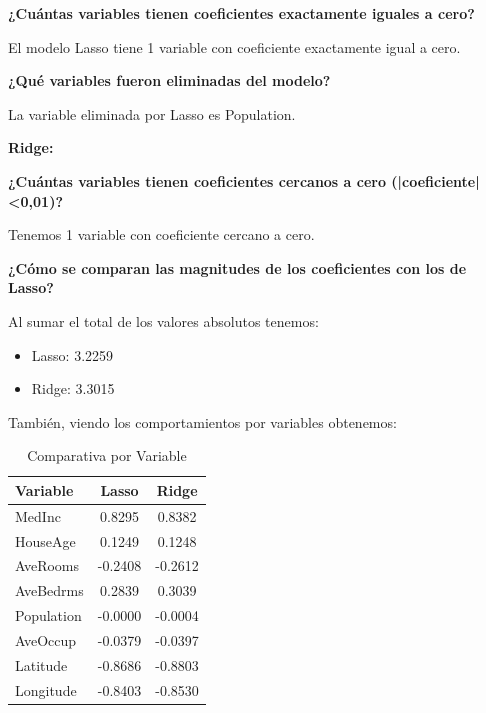 \documentclass[12pt,a4paper]{article}
\begin{document}
\vspace{0.3cm}

\textbf{¿Cuántas variables tienen coeficientes exactamente iguales a cero?}

El modelo Lasso tiene 1 variable con coeficiente exactamente igual a cero.

\vspace{0.3cm}

\textbf{¿Qué variables fueron eliminadas del modelo?}

La variable eliminada por Lasso es Population.

\vspace{0.5cm}

\textbf{Ridge:}

\vspace{0.3cm}

\textbf{¿Cuántas variables tienen coeficientes cercanos a cero (|coeficiente|<0,01)?}

Tenemos 1 variable con coeficiente cercano a cero.

\vspace{0.3cm}

\textbf{¿Cómo se comparan las magnitudes de los coeficientes con los de Lasso?}

Al sumar el total de los valores absolutos tenemos: 

\begin{itemize}
\item Lasso: 3.2259
\item Ridge: 3.3015
\end{itemize}

También, viendo los comportamientos por variables obtenemos: 

\begin{table}[H]
\centering
\caption{Comparativa por Variable}\label{tab:comparativa_por_variable}
\footnotesize
\begin{tabular}{lcc}
\toprule
\textbf{Variable} & \textbf{Lasso} & \textbf{Ridge}\\
\midrule
MedInc & 0.8295 & 0.8382\\
HouseAge & 0.1249 & 0.1248\\
AveRooms & -0.2408 & -0.2612\\
AveBedrms & 0.2839 & 0.3039\\
Population & -0.0000 & -0.0004\\
AveOccup & -0.0379 & -0.0397\\
Latitude & -0.8686 & -0.8803\\
Longitude & -0.8403 & -0.8530\\
\bottomrule
\end{tabular}
\end{table}
\end{document}
